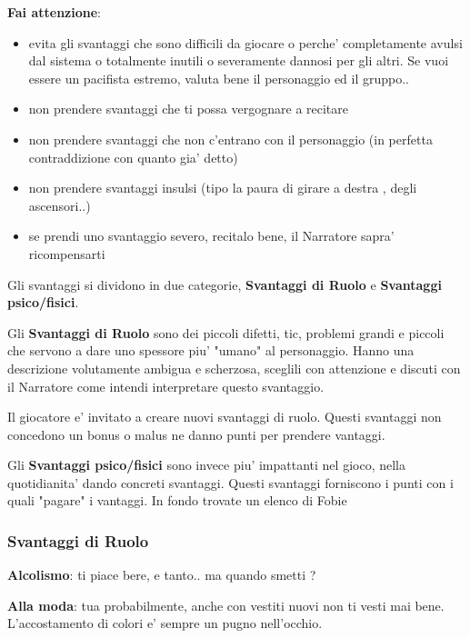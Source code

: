 \documentclass[a4paper,11pt,twoside,openany]{book}
\begin{document}
{\textbf{Fai attenzione}:

\begin{itemize}
\item 
evita gli svantaggi che sono difficili da giocare o perche' completamente avulsi dal sistema o totalmente inutili o severamente dannosi per gli altri. Se vuoi essere un pacifista estremo, valuta bene il personaggio ed il gruppo.. 
\item 
non prendere svantaggi che ti possa vergognare a recitare 
\item 
non prendere svantaggi che non c'entrano con il personaggio (in perfetta contraddizione con quanto gia' detto) 
\item 
non prendere svantaggi insulsi (tipo la paura di girare a destra , degli ascensori..) 
\item 
se prendi uno svantaggio severo, recitalo bene, il Narratore sapra' ricompensarti 
\end{itemize}

Gli svantaggi si dividono in due categorie, \textbf{Svantaggi di Ruolo} e \textbf{Svantaggi psico/fisici}. 

Gli \textbf{Svantaggi di Ruolo} sono dei piccoli difetti, tic, problemi grandi e piccoli che servono a dare uno spessore piu' "umano" al personaggio. Hanno una descrizione volutamente ambigua e scherzosa, sceglili con attenzione e discuti con il Narratore come intendi interpretare questo svantaggio.

Il giocatore e' invitato a creare nuovi svantaggi di ruolo. Questi svantaggi non concedono un bonus o malus ne danno punti per prendere vantaggi.

\bigskip

Gli \textbf{Svantaggi psico/fisici} sono invece piu' impattanti nel gioco, nella quotidianita' dando concreti svantaggi. Questi svantaggi forniscono i punti con i quali "pagare" i vantaggi. In fondo trovate un elenco di Fobie

\pagebreak

\subsubsection{Svantaggi di Ruolo}

\bigskip

\textbf{Alcolismo}: ti piace bere, e tanto.. ma quando smetti ?

\textbf{Alla moda}: tua probabilmente, anche con vestiti nuovi non ti vesti mai bene. L'accostamento di colori e' sempre un pugno nell'occhio.

}
\end{document}
